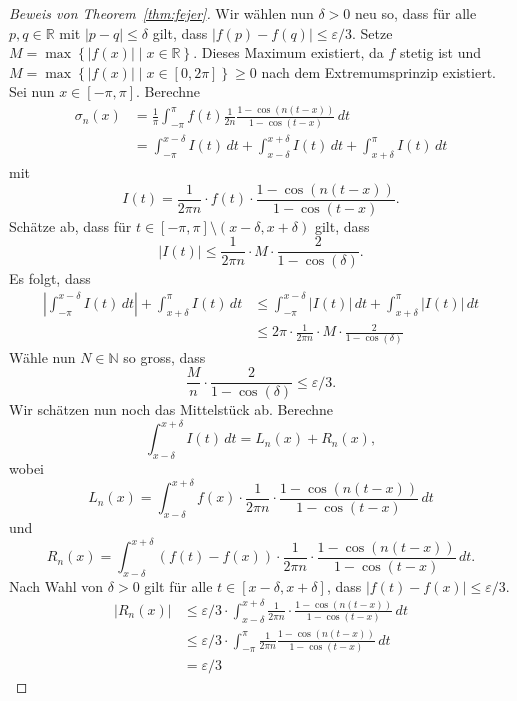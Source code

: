 \documentclass[../main.tex]{subfiles}
\begin{document}
\begin{proof}[Beweis von Theorem~\ref{thm:fejer}]
  Wir wählen nun $\delta > 0$ neu so, dass für alle $p, q \in \mathbb{R}$ 
  mit $|p - q| \leq \delta$ gilt, dass $|f(p) - f(q)| \leq \varepsilon/3$.
  Setze $M = \max \left\{|f(x)| \mid x \in \mathbb{R}\right\}$. Dieses
  Maximum existiert, da $f$ stetig ist und $M = \max
  \left\{|f(x)| \mid x \in [0, 2\pi]\right\} \geq 0$
  nach dem Extremumsprinzip existiert.
  Sei nun $x \in [-\pi, \pi]$.
  Berechne
  \begin{align*}
    \sigma_n(x)
    &= \frac{1}{\pi} \int_{-\pi}^{\pi} f(t)
    \frac{1}{2n} \frac{1 - \cos(n(t-x))}{1 - \cos(t-x)}\, dt  \\
    &= \int_{-\pi}^{x - \delta} I(t) \, dt + \int_{x - \delta}^{x + \delta} I(t) \, dt
    + \int_{x + \delta}^{\pi} I(t) \, dt
  \end{align*}
  mit
  \[
    I(t) = \frac{1}{2 \pi n} \cdot f(t) \cdot \frac{1 - \cos(n(t-x))}{1 - \cos(t-x)}.
  \]
  Schätze ab, dass für $t \in [-\pi, \pi] \setminus (x - \delta, x + \delta)$
  gilt, dass
  \[
    |I(t)| \leq \frac{1}{2 \pi n} \cdot M \cdot \frac{2}{1 - \cos(\delta)}.
  \]
  Es folgt, dass
  \begin{align*}
    \left| \int_{-\pi}^{x - \delta} I(t) \, dt \right|
    + \int_{x + \delta}^{\pi} I(t) \, dt 
    &\leq \int_{-\pi}^{x - \delta} |I(t)| \, dt
    + \int_{x + \delta}^{\pi} |I(t)| \, dt\\
    &\leq 2 \pi \cdot \frac{1}{2 \pi n} \cdot M \cdot \frac{2}{1 - \cos(\delta)}
  \end{align*}
  Wähle nun $N \in \mathbb{N}$ so gross, dass
  \[
    \frac{M}{n} \cdot \frac{2}{1 - \cos(\delta)} \leq \varepsilon/3.
  \]
  Wir schätzen nun noch das Mittelstück ab.
  Berechne
  \[
    \int_{x - \delta}^{x + \delta} I(t) \, dt = L_n(x) + R_n(x),
  \]
  wobei
  \[
    L_n(x) = \int_{x - \delta}^{x + \delta} f(x) \cdot \frac{1}{2 \pi n}
    \cdot \frac{1 - \cos(n(t-x))}{1 - \cos(t- x)}\, dt
  \]
  und
  \[
    R_n(x) = \int_{x - \delta}^{x + \delta} (f(t) - f(x)) \cdot \frac{1}{2\pi n} \cdot
    \frac{1 - \cos(n(t-x))}{1 - \cos(t-x)}\, dt.
  \]
  Nach Wahl von $\delta > 0$ gilt für alle
  $t \in [x - \delta, x + \delta]$, dass
  $|f(t) - f(x)| \leq \varepsilon/3$.
  \begin{align*}
    |R_n(x)| &\leq \varepsilon/3 \cdot \int_{x - \delta}^{x + \delta}
    \frac{1}{2 \pi n} \cdot \frac{1 - \cos(n(t-x))}{1 - \cos(t-x)}\, dt \\
     &\leq \varepsilon/3
     \cdot \int_{-\pi}^{\pi} \frac{1}{2\pi n} \frac{1 - \cos(n(t-x))}{1 - \cos(t-x)} \, dt
   \\&= \varepsilon/3

\end{align*}
\end{proof}
\end{document}
